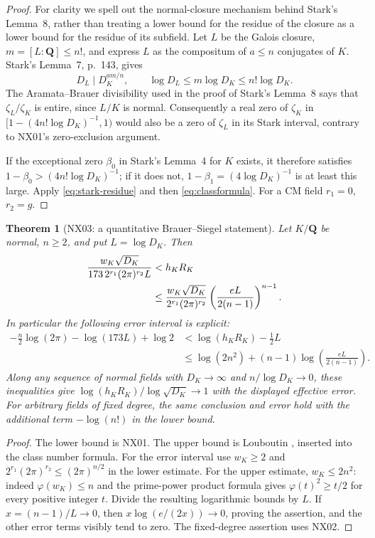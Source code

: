 \documentclass[11pt]{article}
\newtheorem{theorem}{Theorem}[section]
\theoremstyle{remark}
\begin{document}
\begin{proof}
For clarity we spell out the normal-closure mechanism behind Stark's
Lemma~8, rather than treating a lower bound for the residue of the
closure as a lower bound for the residue of its subfield.
Let $L$ be the Galois closure, $m=[L:\mathbf Q]\leq n!$, and express $L$
as the compositum of $a\leq n$ conjugates of $K$. Stark's Lemma~7,
p.~143, gives
\[
 D_L\mid D_K^{am/n},\qquad \log D_L\leq m\log D_K\leq n!\log D_K.
\]
The Aramata--Brauer divisibility used in the proof of Stark's
Lemma~8 says that $\zeta_L/\zeta_K$ is entire, since $L/K$ is normal.
Consequently a real zero of $\zeta_K$ in
$[1-(4n!\log D_K)^{-1},1)$ would also be a zero of $\zeta_L$ in its
Stark interval, contrary to NX01's zero-exclusion argument.

If the exceptional zero $\beta_0$ in Stark's Lemma~4 for $K$ exists,
it therefore satisfies $1-\beta_0>(4n!\log D_K)^{-1}$; if it does not,
$1-\beta_1=(4\log D_K)^{-1}$ is at least this large.
Apply \eqref{eq:stark-residue} and then
\eqref{eq:classformula}. For a CM field $r_1=0$, $r_2=g$.
\end{proof}

\begin{theorem}[NX03: a quantitative Brauer--Siegel statement]
\label{NX03}
Let $K/\mathbf Q$ be normal, $n\geq2$, and put $L=\log D_K$. Then
\begin{align}
 \frac{w_K\sqrt{D_K}}{173\,2^{r_1}(2\pi)^{r_2}L}
 &<h_KR_K\notag\\
 &\leq\frac{w_K\sqrt{D_K}}{2^{r_1}(2\pi)^{r_2}}
       \left(\frac{eL}{2(n-1)}\right)^{n-1}.
 \label{eq:effective-BS}
\end{align}
In particular the following error interval is explicit:
\begin{align*}
 -\frac n2\log(2\pi)-\log(173L)+\log2
 &<\log(h_KR_K)-\frac12L\\
 &\leq\log(2n^2)+(n-1)\log\left(\frac{eL}{2(n-1)}\right).
\end{align*}
Along any sequence of normal fields with $D_K\to\infty$ and
$n/\log D_K\to0$, these inequalities give
$\log(h_KR_K)/\log\sqrt{D_K}\to1$ with the displayed effective error.
For arbitrary fields of fixed degree, the same conclusion and error
hold with the additional term $-\log(n!)$ in the lower bound.
\end{theorem}

\begin{proof}
The lower bound is NX01. The upper bound is Louboutin
\cite[Theorem~1(1), p.~1195]{NC-Louboutin2001}, inserted into the class number
formula. For the error interval use $w_K\geq2$ and
$2^{r_1}(2\pi)^{r_2}\leq(2\pi)^{n/2}$ in the lower estimate.
For the upper estimate, $w_K\leq2n^2$: indeed
$\varphi(w_K)\leq n$ and the prime-power product formula gives
$\varphi(t)^2\geq t/2$ for every positive integer $t$.
Divide the resulting logarithmic bounds by $L$. If $x=(n-1)/L\to0$,
then $x\log(e/(2x))\to0$, proving the assertion, and the other error
terms visibly tend to zero. The fixed-degree assertion uses NX02.
\end{proof}
\end{document}
